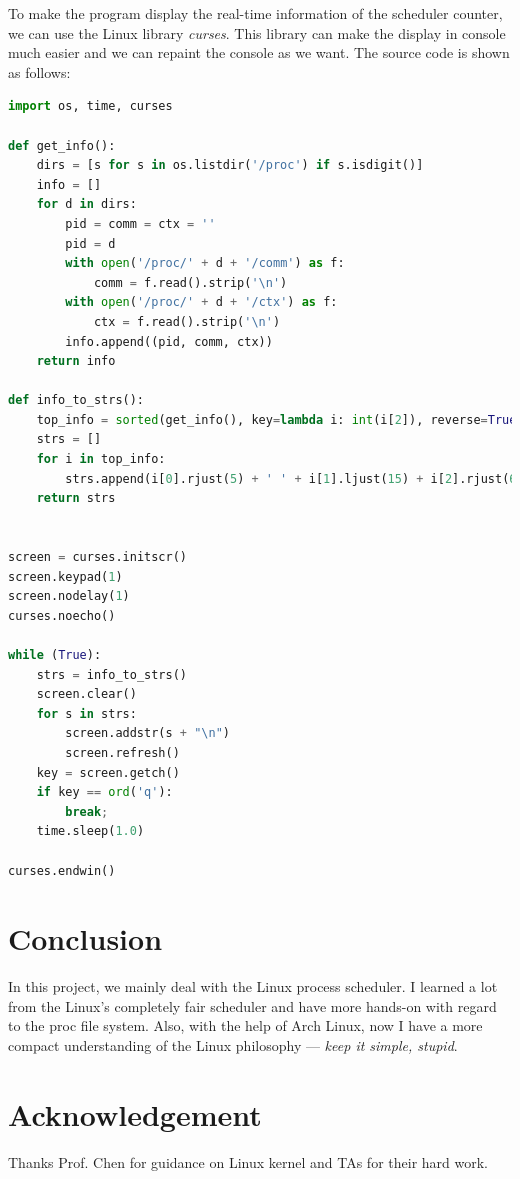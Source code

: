 \documentclass{article}
\begin{document}
To make the program display the real-time information of the scheduler counter, we can use the Linux library \emph{curses}. This library can make the display in console much easier and we can repaint the console as we want. The source code is shown as follows:
\begin{lstlisting}[language=python, caption=top for ctx]
import os, time, curses

def get_info():
	dirs = [s for s in os.listdir('/proc') if s.isdigit()]
	info = []
	for d in dirs:
		pid = comm = ctx = ''
		pid = d
		with open('/proc/' + d + '/comm') as f:
			comm = f.read().strip('\n')
		with open('/proc/' + d + '/ctx') as f:
			ctx = f.read().strip('\n')
		info.append((pid, comm, ctx))
	return info

def info_to_strs():
	top_info = sorted(get_info(), key=lambda i: int(i[2]), reverse=True)[:20]
	strs = []
	for i in top_info:
		strs.append(i[0].rjust(5) + ' ' + i[1].ljust(15) + i[2].rjust(6))
	return strs


screen = curses.initscr()
screen.keypad(1)
screen.nodelay(1)
curses.noecho()

while (True):
	strs = info_to_strs()
	screen.clear()
	for s in strs:
		screen.addstr(s + "\n")
		screen.refresh()
	key = screen.getch()
	if key == ord('q'):
		break;
	time.sleep(1.0)

curses.endwin()
\end{lstlisting}




\section{Conclusion}

In this project, we mainly deal with the Linux process scheduler. I learned a lot from the Linux's completely fair scheduler and have more hands-on with regard to the proc file system. Also, with the help of Arch Linux, now I have a more compact understanding of the Linux philosophy --- \emph{keep it simple, stupid}.

\section*{Acknowledgement}
Thanks Prof. Chen for guidance on Linux kernel and TAs for their hard work.
\end{document}

